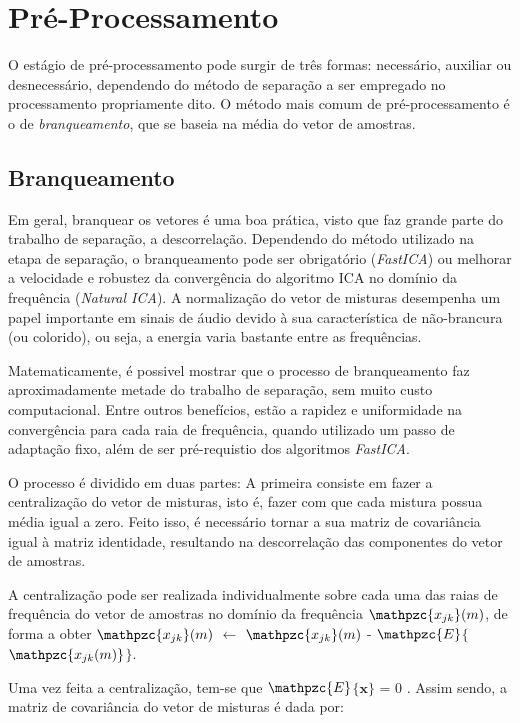 \section{Pré-Processamento}
    O estágio de pré-processamento pode surgir de três formas: necessário, auxiliar ou desnecessário, dependendo do método de separação a ser empregado no processamento propriamente dito. O método mais comum de pré-processamento é o de \textit{branqueamento}, que se baseia na média do vetor de amostras.
    
    \subsection{Branqueamento}
        Em geral, branquear os vetores é uma boa prática, visto que faz grande parte do trabalho de separação, a descorrelação. Dependendo do método utilizado na etapa de separação, o branqueamento pode ser obrigatório (\textit{FastICA}) ou melhorar a velocidade e robustez da convergência do algoritmo ICA no domínio da frequência (\textit{Natural ICA}). A normalização do vetor de misturas desempenha um papel importante em sinais de áudio devido à sua característica de não-brancura (ou colorido), ou seja, a energia varia bastante entre as frequências.
        
        Matematicamente, é possivel mostrar que o processo de branqueamento faz aproximadamente metade do trabalho de separação, sem muito custo computacional. Entre outros benefícios, estão a rapidez e uniformidade na convergência para cada raia de frequência, quando utilizado um passo de adaptação fixo, além de ser pré-requistio dos algoritmos \textit{FastICA}.
        
        O processo é dividido em duas partes: A primeira consiste em fazer a centralização do vetor de misturas, isto é, fazer com que cada mistura possua média igual a zero. Feito isso, é necessário tornar a sua matriz de covariância igual à matriz identidade, resultando na descorrelação das componentes do vetor de amostras.
        
        A centralização pode ser realizada individualmente sobre cada uma das raias de frequência do vetor de amostras no domínio da frequência $\mathpzc{x_{jk}}(m)$, de forma a obter $\mathpzc{x_{jk}}(m)$ $\leftarrow$ $\mathpzc{x_{jk}}(m)$ - $\mathpzc{E}$$\{$$\mathpzc{x_{jk}(m)}$$\}$.
        
        Uma vez feita a centralização, tem-se que $\mathpzc{E}$$\{$$\mathbf{x}$$\}$ = 0 . Assim sendo, a matriz de covariância do vetor de misturas é dada por:
        
